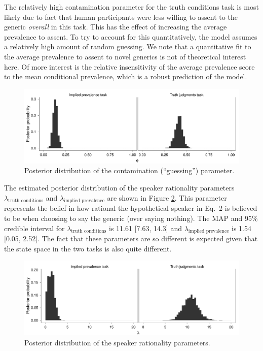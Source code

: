 \documentclass[10pt,letterpaper]{article}
\begin{document}
The relatively high contamination parameter for the truth conditions task is most likely due to fact that human participants were less willing to assent to the generic \emph{overall} in this task.
This has the effect of increasing the average prevalence to assent. 
To try to account for this quantitatively, the model assumes a relatively high amount of random guessing. 
We note that a quantitative fit to the average prevalence to assent to novel generics is not of theoretical interest here. 
Of more interest is the relative insensitivity of the average prevalence score to the mean conditional prevalence, which is a robust prediction of the model. 


\begin{figure}
\centering
    \includegraphics[width=0.8\columnwidth]{asymmetry-phi-3x50k.pdf}
    \caption{Posterior distribution of the contamination (``guessing'') parameter.}
  \label{fig:phi2}
\end{figure}

The estimated posterior distribution of the speaker rationality parameters $\lambda_{\text{truth conditions}}$ and $\lambda_{\text{implied prevalence}}$ are shown in Figure \ref{fig:rationality2}. 
This parameter represents the belief in how rational the hypothetical speaker in Eq.~2 is believed to be when choosing to say the generic (over saying nothing). 
The MAP and 95\% credible interval for $\lambda_{\text{truth conditions}}$ is 11.61 [7.63, 14.3] and $\lambda_{\text{implied prevalence}}$ is 1.54 [0.05, 2.52]. 
The fact that these parameters are so different is expected given that the state space in the two tasks is also quite different.


\begin{figure}
\centering
    \includegraphics[width=0.8\columnwidth]{asymmetry-speakeropts-3x50k.pdf}
    \caption{Posterior distribution of the speaker rationality parameters.}
  \label{fig:rationality2}
\end{figure}
\end{document}
